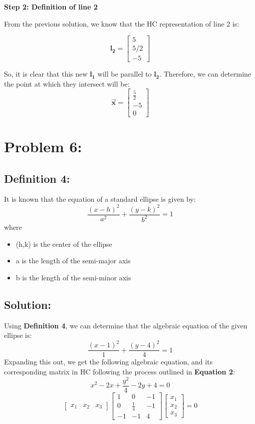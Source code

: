\documentclass{article}
\begin{document}
\textbf{Step 2: Definition of line 2}

From the previous solution, we know that the HC representation of line 2 is:

\[\boldsymbol{l_2} = \begin{bmatrix}
    5 \\ 5/2 \\ -5
\end{bmatrix}\]

So, it is clear that this new $\boldsymbol{l_1}$ will be parallel to $\boldsymbol{l_2}$. Therefore, we can determine the point at which they intersect will be: 
\[\boldsymbol{\Vec{x}} = \begin{bmatrix}
    \frac{5}{2} \\ -5 \\ 0
\end{bmatrix}\]
\newpage
\section*{Problem 6:}
\subsection*{Definition 4:}
It is known that the equation of a standard ellipse is given by: 
\[\frac{(x-h)^2}{a^2} + \frac{(y-k)^2}{b^2} = 1\] where
\begin{itemize}
    \item (h,k) is the center of the ellipse
    \item a is the length of the semi-major axis
    \item b is the length of the semi-minor axis
\end{itemize}

\subsection*{Solution:}
Using \textbf{Definition 4}, we can determine that the algebraic equation of the given ellipse is:
\[\frac{(x-1)^2}{1} + \frac{(y-4)^2}{4} = 1\]
Expanding this out, we get the following algebraic equation, and its corresponding matrix in HC following the process outlined in \textbf{Equation 2}:
\[x^2 -2x + \frac{y^2}{4} - 2y + 4 = 0\]
\[\begin{bmatrix}
    x_1 & x_2 & x_3
\end{bmatrix} \begin{bmatrix}
    1 & 0 & -1 \\
    0 & \frac{1}{4} & -1 \\
    -1 & -1 & 4
\end{bmatrix} \begin{bmatrix}
    x_1 \\ x_2 \\ x_3
\end{bmatrix} = 0\]
\end{document}
